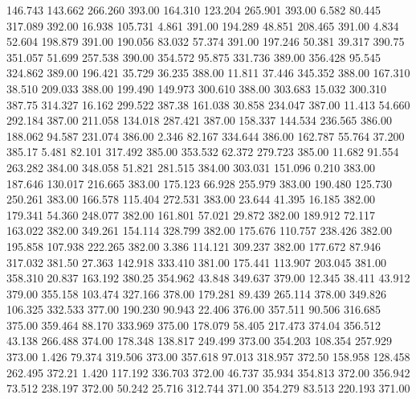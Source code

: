  146.743  143.662  266.260       393.00
 164.310  123.204  265.901       393.00
   6.582   80.445  317.089       392.00
  16.938  105.731    4.861       391.00
 194.289   48.851  208.465       391.00
   4.834   52.604  198.879       391.00
 190.056   83.032   57.374       391.00
 197.246   50.381   39.317       390.75
 351.057   51.699  257.538       390.00
 354.572   95.875  331.736       389.00
 356.428   95.545  324.862       389.00
 196.421   35.729   36.235       388.00
  11.811   37.446  345.352       388.00
 167.310   38.510  209.033       388.00
 199.490  149.973  300.610       388.00
 303.683   15.032  300.310       387.75
 314.327   16.162  299.522       387.38
 161.038   30.858  234.047       387.00
  11.413   54.660  292.184       387.00
 211.058  134.018  287.421       387.00
 158.337  144.534  236.565       386.00
 188.062   94.587  231.074       386.00
   2.346   82.167  334.644       386.00
 162.787   55.764   37.200       385.17
   5.481   82.101  317.492       385.00
 353.532   62.372  279.723       385.00
  11.682   91.554  263.282       384.00
 348.058   51.821  281.515       384.00
 303.031  151.096    0.210       383.00
 187.646  130.017  216.665       383.00
 175.123   66.928  255.979       383.00
 190.480  125.730  250.261       383.00
 166.578  115.404  272.531       383.00
  23.644   41.395   16.185       382.00
 179.341   54.360  248.077       382.00
 161.801   57.021   29.872       382.00
 189.912   72.117  163.022       382.00
 349.261  154.114  328.799       382.00
 175.676  110.757  238.426       382.00
 195.858  107.938  222.265       382.00
   3.386  114.121  309.237       382.00
 177.672   87.946  317.032       381.50
  27.363  142.918  333.410       381.00
 175.441  113.907  203.045       381.00
 358.310   20.837  163.192       380.25
 354.962   43.848  349.637       379.00
  12.345   38.411   43.912       379.00
 355.158  103.474  327.166       378.00
 179.281   89.439  265.114       378.00
 349.826  106.325  332.533       377.00
 190.230   90.943   22.406       376.00
 357.511   90.506  316.685       375.00
 359.464   88.170  333.969       375.00
 178.079   58.405  217.473       374.04
 356.512   43.138  266.488       374.00
 178.348  138.817  249.499       373.00
 354.203  108.354  257.929       373.00
   1.426   79.374  319.506       373.00
 357.618   97.013  318.957       372.50
 158.958  128.458  262.495       372.21
   1.420  117.192  336.703       372.00
  46.737   35.934  354.813       372.00
 356.942   73.512  238.197       372.00
  50.242   25.716  312.744       371.00
 354.279   83.513  220.193       371.00
